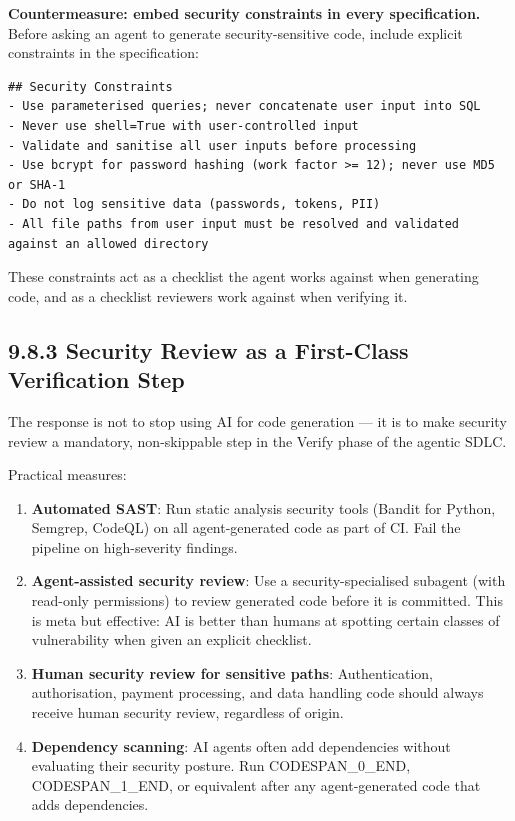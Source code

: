 \documentclass[11pt,a4paper]{book}
\begin{document}
\textbf{Countermeasure: embed security constraints in every specification.} Before asking an agent to generate security-sensitive code, include explicit constraints in the specification:

\begin{lstlisting}
## Security Constraints
- Use parameterised queries; never concatenate user input into SQL
- Never use shell=True with user-controlled input
- Validate and sanitise all user inputs before processing
- Use bcrypt for password hashing (work factor >= 12); never use MD5 or SHA-1
- Do not log sensitive data (passwords, tokens, PII)
- All file paths from user input must be resolved and validated against an allowed directory
\end{lstlisting}

These constraints act as a checklist the agent works against when generating code, and as a checklist reviewers work against when verifying it.

\subsection{9.8.3 Security Review as a First-Class Verification Step}

The response is not to stop using AI for code generation --- it is to make security review a mandatory, non-skippable step in the Verify phase of the agentic SDLC.

Practical measures:

\begin{enumerate}
  \item \textbf{Automated SAST}: Run static analysis security tools (Bandit for Python, Semgrep, CodeQL) on all agent-generated code as part of CI. Fail the pipeline on high-severity findings.
  \item \textbf{Agent-assisted security review}: Use a security-specialised subagent (with read-only permissions) to review generated code before it is committed. This is meta but effective: AI is better than humans at spotting certain classes of vulnerability when given an explicit checklist.
  \item \textbf{Human security review for sensitive paths}: Authentication, authorisation, payment processing, and data handling code should always receive human security review, regardless of origin.
  \item \textbf{Dependency scanning}: AI agents often add dependencies without evaluating their security posture. Run CODESPAN\_0\_END, CODESPAN\_1\_END, or equivalent after any agent-generated code that adds dependencies.
\end{enumerate}
\end{document}
